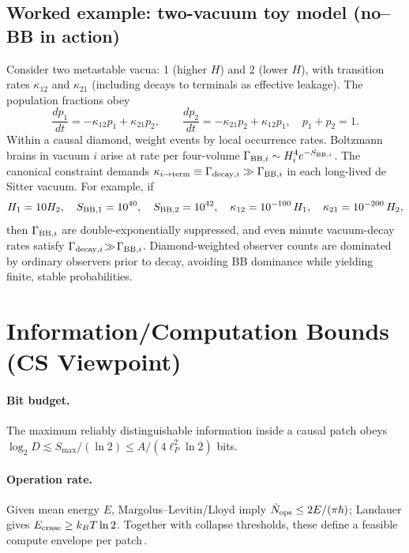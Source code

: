 \documentclass[12pt]{article}
\theoremstyle{remark}
\begin{document}
\subsection*{Worked example: two-vacuum toy model (no--BB in action)}
Consider two metastable vacua: 1 (higher $H$) and 2 (lower $H$), with transition rates $\kappa_{12}$ and $\kappa_{21}$ (including decays to terminals as effective leakage). The population fractions obey
\begin{equation}
 \frac{dp_1}{dt}= -\kappa_{12} p_1 + \kappa_{21} p_2,\qquad \frac{dp_2}{dt}= -\kappa_{21} p_2 + \kappa_{12} p_1,\quad p_1{+}p_2=1.
\end{equation}
Within a causal diamond, weight events by local occurrence rates. Boltzmann brains in vacuum $i$ arise at rate per four-volume $\Gamma_{{\rm BB},i}\sim H_i^4 e^{-S_{{\rm BB},i}}$. The canonical constraint demands $\kappa_{i\to{\rm term}}\equiv \Gamma_{{\rm decay},i} \gg \Gamma_{{\rm BB},i}$ in each long-lived de Sitter vacuum. For example, if
\[
 H_1=10 H_2,\quad S_{{\rm BB},1}=10^{40},\quad S_{{\rm BB},2}=10^{42},\quad \kappa_{12}=10^{-100}\,H_1,\quad \kappa_{21}=10^{-200}\,H_2,
\]
then $\Gamma_{{\rm BB},i}$ are double-exponentially suppressed, and even minute vacuum-decay rates satisfy $\Gamma_{{\rm decay},i}\!\gg\!\Gamma_{{\rm BB},i}$. Diamond-weighted observer counts are dominated by ordinary observers prior to decay, avoiding BB dominance while yielding finite, stable probabilities.

\section{Information/Computation Bounds (CS Viewpoint)}
\paragraph{Bit budget.} The maximum reliably distinguishable information inside a causal patch obeys $\log_2 D \lesssim S_{\max}/(\ln 2) \le A/(4\ell_P^2\ln 2)$ bits.
\paragraph{Operation rate.} Given mean energy $E$, Margolus--Levitin/Lloyd imply $\dot N_{\rm ops} \le 2E/(\pi\hbar)$; Landauer gives $E_{\rm erase}\ge k_B T \ln 2$. Together with collapse thresholds, these define a feasible compute envelope per patch\,\cite{MargolusLevitin1998,Lloyd2000}.
\end{document}
